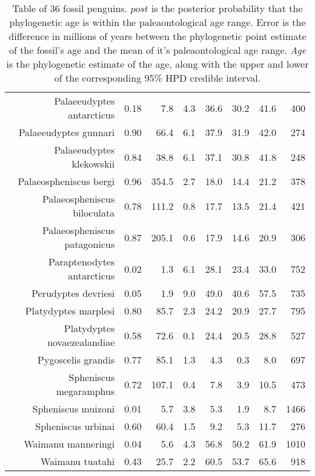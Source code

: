 \begin{table}[ht]
\begin{tabular}{rrrrrrrr}
  Palaeeudyptes antarcticus & 0.18 & 7.8 & 4.3 & 36.6 & 30.2 & 41.6 & 400 \\ 
  Palaeeudyptes gunnari & 0.90 & 66.4 & 6.1 & 37.9 & 31.9 & 42.0 & 274 \\ 
  Palaeeudyptes klekowskii & 0.84 & 38.8 & 6.1 & 37.1 & 30.8 & 41.8 & 248 \\ 
  Palaeospheniscus bergi & 0.96 & 354.5 & 2.7 & 18.0 & 14.4 & 21.2 & 378 \\ 
  Palaeospheniscus biloculata & 0.78 & 111.2 & 0.8 & 17.7 & 13.5 & 21.4 & 421 \\ 
  Palaeospheniscus patagonicus & 0.87 & 205.1 & 0.6 & 17.9 & 14.6 & 20.9 & 306 \\ 
  Paraptenodytes antarcticus & 0.02 & 1.3 & 6.1 & 28.1 & 23.4 & 33.0 & 752 \\ 
  Perudyptes devriesi & 0.05 & 1.9 & 9.0 & 49.0 & 40.6 & 57.5 & 735 \\ 
  Platydyptes marplesi & 0.80 & 85.7 & 2.3 & 24.2 & 20.9 & 27.7 & 795 \\ 
  Platydyptes novaezealandiae & 0.58 & 72.6 & 0.1 & 24.4 & 20.5 & 28.8 & 527 \\ 
  Pygoscelis grandis & 0.77 & 85.1 & 1.3 & 4.3 & 0.3 & 8.0 & 697 \\ 
  Spheniscus megaramphus & 0.72 & 107.1 & 0.4 & 7.8 & 3.9 & 10.5 & 473 \\ 
  Spheniscus muizoni & 0.01 & 5.7 & 3.8 & 5.3 & 1.9 & 8.7 & 1466 \\ 
  Spheniscus urbinai & 0.60 & 60.4 & 1.5 & 9.2 & 5.3 & 11.7 & 276 \\ 
  Waimanu manneringi & 0.04 & 5.6 & 4.3 & 56.8 & 50.2 & 61.9 & 1010 \\ 
  Waimanu tuatahi & 0.43 & 25.7 & 2.2 & 60.5 & 53.7 & 65.6 & 918 \\ 
   \hline
\end{tabular}
\caption{Table of 36 fossil penguins. $post$ is the posterior probability that the phylogenetic age is within the paleaontological age range. Error is the difference in millions of years between the phylogenetic point estimate of the fossil's age and the mean of it's paleaontological age range. {\em Age} is the phylogenetic estimate of the age, along with the upper and lower of the corresponding 95\% HPD credible interval.} 
\label{fossilTable}
\end{table}
